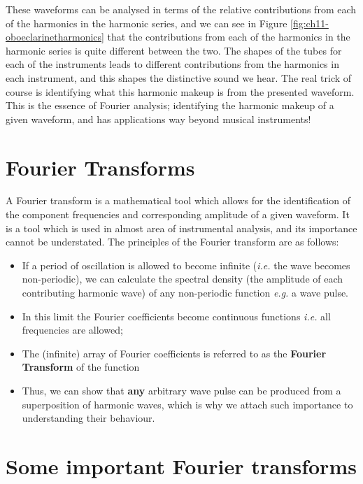 \documentclass[
]{book}
\providecommand{\tightlist}{%
  \setlength{\itemsep}{0pt}\setlength{\parskip}{0pt}}
\begin{document}
These waveforms can be analysed in terms of the relative contributions from each of the harmonics in the harmonic series, and we can see in Figure \ref{fig:ch11-oboeclarinetharmonics} that the contributions from each of the harmonics in the harmonic series is quite different between the two. The shapes of the tubes for each of the instruments leads to different contributions from the harmonics in each instrument, and this shapes the distinctive sound we hear. The real trick of course is identifying what this harmonic makeup is from the presented waveform. This is the essence of Fourier analysis; identifying the harmonic makeup of a given waveform, and has applications way beyond musical instruments!

\hypertarget{sec:ch11-fouriertransforms}{%
\section{Fourier Transforms}\label{sec:ch11-fouriertransforms}}

A Fourier transform is a mathematical tool which allows for the identification of the component frequencies and corresponding amplitude of a given waveform. It is a tool which is used in almost area of instrumental analysis, and its importance cannot be understated. The principles of the Fourier transform are as follows:

\begin{itemize}
\tightlist
\item
  If a period of oscillation is allowed to become infinite (\emph{i.e.} the wave becomes non-periodic), we can calculate the spectral density (the amplitude of each contributing harmonic wave) of any non-periodic function \emph{e.g.} a wave pulse.
\item
  In this limit the Fourier coefficients become continuous functions \emph{i.e.} all frequencies are allowed;
\item
  The (infinite) array of Fourier coefficients is referred to as the \textbf{Fourier Transform} of the function
\item
  Thus, we can show that \textbf{any} arbitrary wave pulse can be produced from a superposition of harmonic waves, which is why we attach such importance to understanding their behaviour.
\end{itemize}

\hypertarget{sec:ch11-importantfouriertransforms}{%
\section{Some important Fourier transforms}\label{sec:ch11-importantfouriertransforms}}
\end{document}
